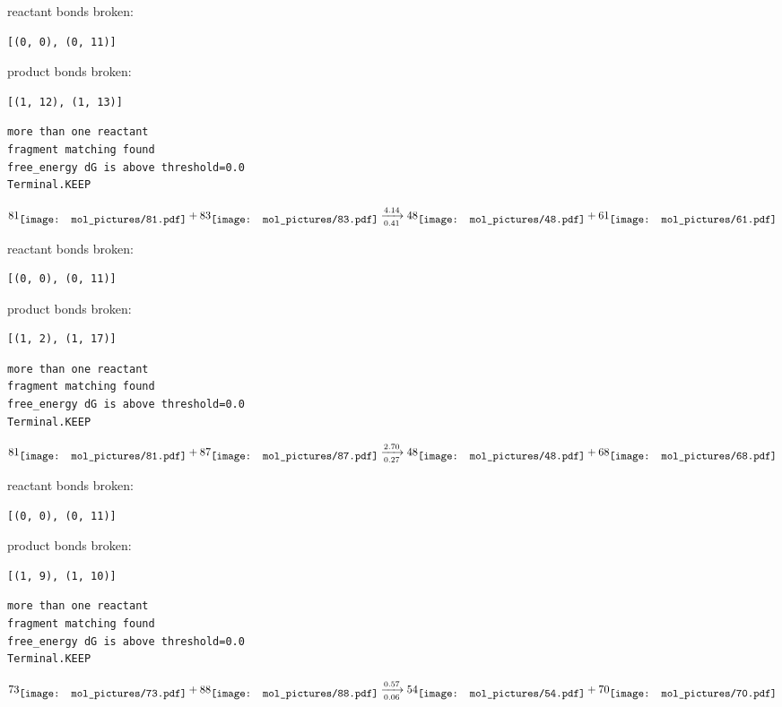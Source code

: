 \documentclass{article}
\begin{document}
reactant bonds broken:\begin{verbatim}
[(0, 0), (0, 11)]
\end{verbatim}
product bonds broken:\begin{verbatim}
[(1, 12), (1, 13)]
\end{verbatim}




\vspace{1cm}
\begin{verbatim}
more than one reactant
fragment matching found
free_energy dG is above threshold=0.0
Terminal.KEEP
\end{verbatim}
$$
81
\raisebox{-.5\height}{\texttt{[image: mol\_pictures/81.pdf]}}
+
83
\raisebox{-.5\height}{\texttt{[image: mol\_pictures/83.pdf]}}
\xrightarrow[0.41]{4.14}
48
\raisebox{-.5\height}{\texttt{[image: mol\_pictures/48.pdf]}}
+
61
\raisebox{-.5\height}{\texttt{[image: mol\_pictures/61.pdf]}}
$$


reactant bonds broken:\begin{verbatim}
[(0, 0), (0, 11)]
\end{verbatim}
product bonds broken:\begin{verbatim}
[(1, 2), (1, 17)]
\end{verbatim}




\vspace{1cm}
\begin{verbatim}
more than one reactant
fragment matching found
free_energy dG is above threshold=0.0
Terminal.KEEP
\end{verbatim}
$$
81
\raisebox{-.5\height}{\texttt{[image: mol\_pictures/81.pdf]}}
+
87
\raisebox{-.5\height}{\texttt{[image: mol\_pictures/87.pdf]}}
\xrightarrow[0.27]{2.70}
48
\raisebox{-.5\height}{\texttt{[image: mol\_pictures/48.pdf]}}
+
68
\raisebox{-.5\height}{\texttt{[image: mol\_pictures/68.pdf]}}
$$


reactant bonds broken:\begin{verbatim}
[(0, 0), (0, 11)]
\end{verbatim}
product bonds broken:\begin{verbatim}
[(1, 9), (1, 10)]
\end{verbatim}




\vspace{1cm}
\begin{verbatim}
more than one reactant
fragment matching found
free_energy dG is above threshold=0.0
Terminal.KEEP
\end{verbatim}
$$
73
\raisebox{-.5\height}{\texttt{[image: mol\_pictures/73.pdf]}}
+
88
\raisebox{-.5\height}{\texttt{[image: mol\_pictures/88.pdf]}}
\xrightarrow[0.06]{0.57}
54
\raisebox{-.5\height}{\texttt{[image: mol\_pictures/54.pdf]}}
+
70
\raisebox{-.5\height}{\texttt{[image: mol\_pictures/70.pdf]}}
$$
\end{document}
